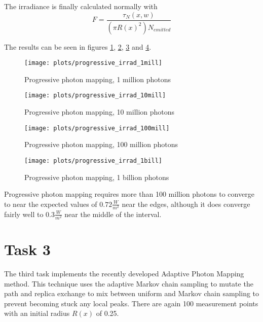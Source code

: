 The irradiance is finally calculated normally with
$$ F = \frac{\tau_{N}(x, w)}{(\pi R(x)^2) N_{emitted}} $$

The results can be seen in figures \ref{fig:progressive_irrad1}, \ref{fig:progressive_irrad10}, \ref{fig:progressive_irrad100} and \ref{fig:progressive_irrad1000}.

\begin{figure}[H]
    \centering
    \texttt{[image: plots/progressive\_irrad\_1mill]}\\
    \caption{Progressive photon mapping, 1 million photons}
    \label{fig:progressive_irrad1}
\end{figure}

\begin{figure}[H]
    \centering
    \texttt{[image: plots/progressive\_irrad\_10mill]}\\
    \caption{Progressive photon mapping, 10 million photons}
    \label{fig:progressive_irrad10}
\end{figure}

\begin{figure}[H]
    \centering
    \texttt{[image: plots/progressive\_irrad\_100mill]}\\
    \caption{Progressive photon mapping, 100 million photons}
    \label{fig:progressive_irrad100}
\end{figure}

\begin{figure}[H]
    \centering
    \texttt{[image: plots/progressive\_irrad\_1bill]}\\
    \caption{Progressive photon mapping, 1 billion photons}
    \label{fig:progressive_irrad1000}
\end{figure}
\pagebreak
Progressive photon mapping requires more than 100 million photons to converge to near the expected values of $0.72 \frac{W}{m^2}$ near the edges, although it does converge fairly well to $0.3 \frac{W}{m^2} $ near the middle of the interval. 

\section*{Task 3}
The third task implements the recently developed Adaptive Photon Mapping method. This technique uses the adaptive Markov chain sampling to mutate the path and replica exchange to mix between uniform and Markov chain sampling to prevent becoming stuck any local peaks. There are again 100 measurement points with an initial radius $ R(x) $ of 0.25. 

